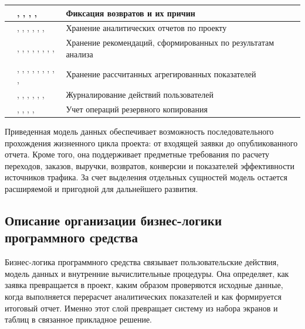 {\begin{longtable}{|P{0.19\textwidth}|P{0.33\textwidth}|P{0.38\textwidth}|}
    \hline
     & , , , ,  & Фиксация возвратов и их причин \\
    \hline
     & , , , , , ,  & Хранение аналитических отчетов по проекту \\
    \hline
     & , , , , , , , ,  & Хранение рекомендаций, сформированных по результатам анализа \\
    \hline
     & , , , , , , , , ,  & Хранение рассчитанных агрегированных показателей \\
    \hline
     & , , , , , ,  & Журналирование действий пользователей \\
    \hline
     & , , , ,  & Учет операций резервного копирования \\
    \hline
\end{longtable}
}

Приведенная модель данных обеспечивает возможность последовательного прохождения жизненного цикла проекта: от входящей заявки до опубликованного отчета. Кроме того, она поддерживает предметные требования по расчету переходов, заказов, выручки, возвратов, конверсии и показателей эффективности источников трафика. За счет выделения отдельных сущностей модель остается расширяемой и пригодной для дальнейшего развития.

\subsection{Описание организации бизнес-логики программного средства}

Бизнес-логика программного средства связывает пользовательские действия, модель данных и внутренние вычислительные процедуры. Она определяет, как заявка превращается в проект, каким образом проверяются исходные данные, когда выполняется перерасчет аналитических показателей и как формируется итоговый отчет. Именно этот слой превращает систему из набора экранов и таблиц в связанное прикладное решение.

